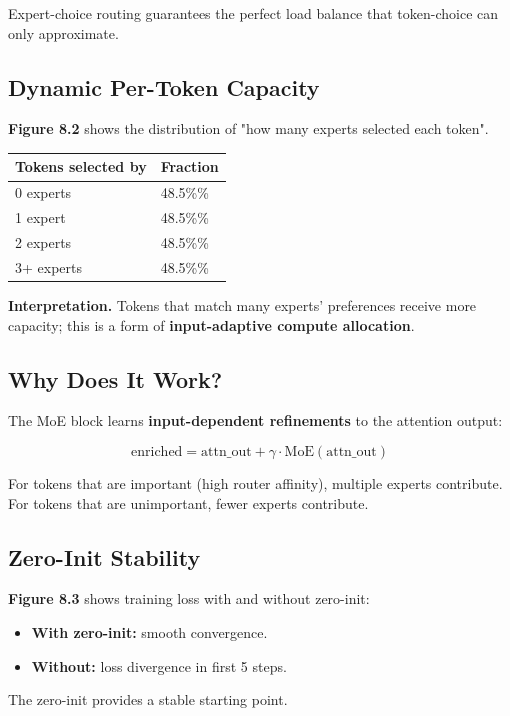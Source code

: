 Expert-choice routing guarantees the perfect load balance that token-choice 
can only approximate.

\subsection{Dynamic Per-Token Capacity}

\textbf{Figure 8.2} shows the distribution of "how many experts selected each 
token".

\begin{table}[H]
\centering
\small
\begin{tabular}{ll}
\toprule
\textbf{Tokens selected by} & \textbf{Fraction} \\
\midrule
0 experts & 48.5\%\% \\
1 expert & 48.5\%\% \\
2 experts & 48.5\%\% \\
3+ experts & 48.5\%\% \\
\bottomrule
\end{tabular}
\end{table}

\textbf{Interpretation.} Tokens that match many experts' preferences receive 
more capacity; this is a form of \textbf{input-adaptive compute allocation}.

\subsection{Why Does It Work?}

The MoE block learns \textbf{input-dependent refinements} to the attention output:

\[
\text{enriched} = \text{attn\_out} + \gamma \cdot \text{MoE}(\text{attn\_out})
\tag{8.1}
\]

For tokens that are important (high router affinity), multiple experts 
contribute. For tokens that are unimportant, fewer experts contribute.

\subsection{Zero-Init Stability}

\textbf{Figure 8.3} shows training loss with and without zero-init:

\begin{itemize}
\item \textbf{With zero-init:} smooth convergence.
\item \textbf{Without:} loss divergence in first 5 steps.

\end{itemize}
The zero-init provides a stable starting point.

